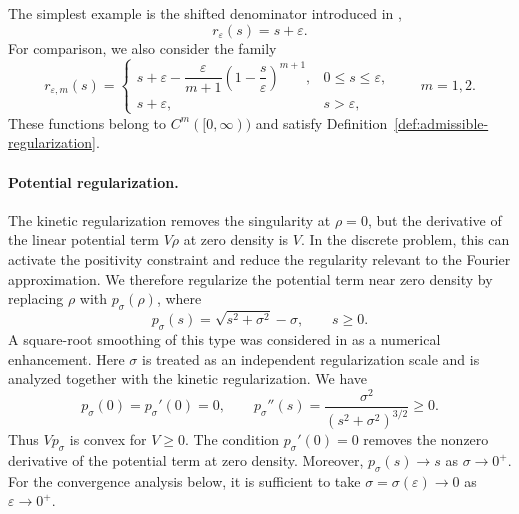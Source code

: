 \documentclass[11pt]{article}
\newcommand{\eps}{\varepsilon}
\newcommand{\sig}{\sigma}
\theoremstyle{plain}
\theoremstyle{definition}
\numberwithin{equation}{section}
\begin{document}
The simplest example is the shifted denominator introduced in
\cite{BaoRuan2019},
\begin{equation}
\label{eq:shift-denominator}
r_\eps(s)=s+\eps.
\end{equation}
For comparison, we also consider the family
\begin{equation}
\label{eq:piecewise-regularization-family}
r_{\eps,m}(s)
=
\begin{cases}
s+\eps-\dfrac{\eps}{m+1}
\left(1-\dfrac{s}{\eps}\right)^{m+1},
&0\le s\le\eps,\\[2ex]
s+\eps,
&s>\eps,
\end{cases}
\qquad m=1,2.
\end{equation}
These functions belong to $C^m([0,\infty))$ and satisfy
Definition~\ref{def:admissible-regularization}. 

\paragraph{Potential regularization.}

The kinetic regularization removes the singularity at $\rho=0$, but
the derivative of the linear potential term $V\rho$ at zero density
is $V$. In the discrete problem, this can activate the positivity
constraint and reduce the regularity relevant to the Fourier
approximation. We therefore regularize the potential term near zero
density by replacing $\rho$ with $p_\sig(\rho)$, where 
\begin{equation}
\label{eq:potential-regularizer}
p_\sig(s)
=
\sqrt{s^2+\sig^2}-\sig,
\qquad s\ge0.
\end{equation}
A square-root smoothing of this type was considered in
\cite{BaoRuan2019} as a numerical enhancement. Here $\sig$ is treated
as an independent regularization scale and is analyzed together with
the kinetic regularization. We have
\begin{equation}
\label{eq:potential-regularizer-derivatives}
p_\sig(0)=p_\sig'(0)=0,
\qquad
p_\sig''(s)
=
\frac{\sig^2}{(s^2+\sig^2)^{3/2}}
\ge0.
\end{equation}
Thus $Vp_\sig$ is convex for $V\ge0$. 
The condition
$p_\sig'(0)=0$ removes the nonzero derivative of the potential term
at zero density.
Moreover, $p_\sig(s)\to s$ as $\sig\to0^+$. For the convergence
analysis below, it is sufficient to take
$\sig=\sig(\eps)\to0$ as $\eps\to0^+$.
\end{document}
